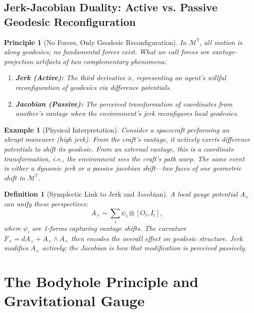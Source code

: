 \documentclass{article}
\newtheorem{definition}{Definition}
\newtheorem{principle}{Principle}
\newtheorem{example}{Example}
\begin{document}
\subsection*{Jerk-Jacobian Duality: Active vs. Passive Geodesic Reconfiguration}

\begin{principle}[No Forces, Only Geodesic Reconfiguration]
In $\mathcal{M}^7$, all motion is along geodesics; no fundamental forces exist. \emph{What we call forces} are vantage-projection artifacts of two complementary phenomena:
\begin{enumerate}
  \item \textbf{Jerk (Active):} The third derivative $\dddot{x}$, representing an agent's willful reconfiguration of geodesics via difference potentials.
  \item \textbf{Jacobian (Passive):} The perceived transformation of coordinates from another's vantage when the environment's jerk reconfigures local geodesics.
\end{enumerate}
\end{principle}

\begin{example}[Physical Interpretation]
Consider a spacecraft performing an abrupt maneuver (high jerk). \emph{From the craft's vantage}, it actively exerts difference potentials to shift its geodesic. \emph{From an external vantage}, this is a coordinate transformation, i.e., the environment sees the craft's path warp. The same event is either a dynamic jerk or a passive jacobian shift---two faces of one geometric shift in $\mathcal{M}^7$.
\end{example}

\begin{definition}[Symplectic Link to Jerk and Jacobian]
A local gauge potential $A_\times$ can unify these perspectives:
\begin{equation}
A_\times = \sum_i \psi_i \otimes [O_i,I_i],
\end{equation}
where $\psi_i$ are 1-forms capturing vantage shifts. The curvature $F_\times = dA_\times + A_\times\wedge A_\times$ then encodes the overall effect on geodesic structure. \emph{Jerk} modifies $A_\times$ actively; the \emph{Jacobian} is how that modification is perceived passively.
\end{definition}

\section{The Bodyhole Principle and Gravitational Gauge}
\end{document}
